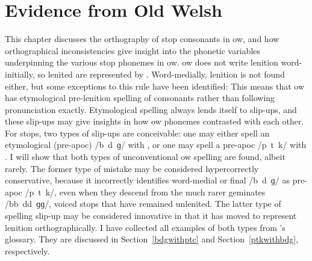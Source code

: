 \chapter{Evidence from Old Welsh}
\label{oldwelsh}
This chapter discusses the orthography of stop consonants in \gls{ow}, and how orthographical inconsistencies give insight into the phonetic variables underpinning the various stop phonemes in \gls{ow}.  \Gls{ow} does not write lenition word-initially, so lenited  are represented by . Word-medially, lenition is not found either, but some exceptions to this rule have been identified: 
This means that \gls{ow} has etymological pre-lenition spelling of consonants rather than following pronunciation exactly. Etymological spelling always lends itself to slip-ups, and these slip-ups may give insights in how \gls{ow} phonemes contrasted with each other. For stops, two types of slip-ups are conceivable: one may either spell an etymological (pre-\gls{apoc}) /b~d~ɡ/ with , or one may spell a pre-\gls{apoc} /p~t~k/ with . I will show that both types of unconventional \gls{ow} spelling are found, albeit rarely. The former type of mistake may be considered hypercorrectly conservative, because it incorrectly identifies word-medial or final /b~d~ɡ/ as pre-\gls{apoc} /p~t~k/, even when they descend from the much rarer geminates /bb~dd~ɡɡ/, \ie voiced stops that have remained unlenited. The latter type of spelling slip-up may be considered innovative in that it has moved to represent lenition orthographically. I have collected all examples of both types from \textcite{falileyev_etymological_2000}'s glossary. They are discussed in Section~\ref{bdgwithptc} and Section~\ref{ptkwithbdg}, respectively.





